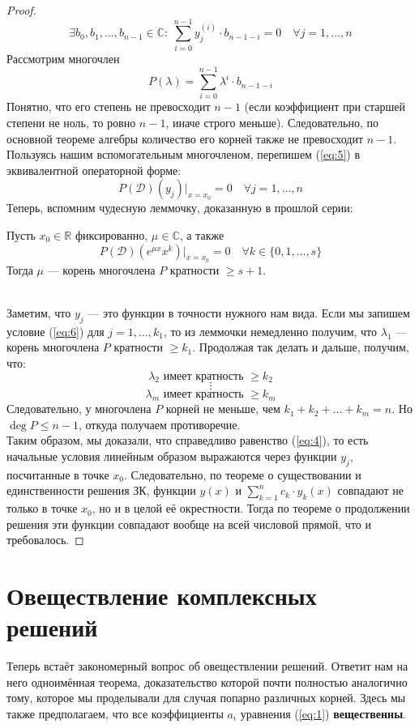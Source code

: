 \documentclass[11pt]{article}
\begin{document}
\begin{proof}
    \[\tag{5} \label{eq:5} \exists b_0, b_1, \dots, b_{n-1} \in \mathbb{C}: \ \sum_{i = 0}^{n - 1} y_j^{(i)} \cdot b_{n-1-i} = 0 \quad \forall j = 1, \dots, n\]
    Рассмотрим многочлен \[P(\lambda) = \sum_{i = 0}^{n-1} \lambda^i \cdot b_{n-1-i}\]
    Понятно, что его степень не превосходит $n - 1$ (если коэффициент при старшей степени не ноль, то ровно $n - 1$, иначе строго меньше). Следовательно, по основной теореме алгебры количество его корней также не превосходит $n - 1$. \\
    Пользуясь нашим вспомогательным многочленом, перепишем (\ref{eq:5}) в эквивалентной операторной форме:
    \[\tag{6} \label{eq:6} P(\mathcal{D})(y_j) \bigg|_{x = x_0} = 0 \quad \forall j = 1, \ldots, n\]
    Теперь, вспомним чудесную леммочку, доказанную в прошлой серии:
    \begin{lemma}
        Пусть $x_0 \in \mathbb{R}$ фиксированно, $\mu \in \mathbb{C}$, а также \[P(\mathcal{D}) \left(e^{\mu x} x^k\right) \bigg|_{x=x_0} = 0 
        \quad \forall k \in \{0, 1, \dots, s\}\]
        Тогда $\mu$ --- корень многочлена $P$ кратности $\geq s + 1$.
    \end{lemma} \leavevmode
    \\
    Заметим, что $y_j$ --- это функции в точности нужного нам вида. Если мы запишем условие (\ref{eq:6}) для $j = 1, \ldots, k_1$, то из леммочки немедленно получим, что $\lambda_1$ --- корень многочлена $P$ кратности $\geq k_1$. Продолжая так делать и дальше, получим, что:
    \[\lambda_2 \text{ имеет кратность } \geq k_2\]
    \[\vdots\]
    \[\lambda_m \text{ имеет кратность } \geq k_m\]
    Следовательно, у многочлена $P$ корней не меньше, чем $k_1 + k_2 + \ldots + k_m = n$. Но $\deg P \leq n - 1$, откуда получаем противоречие. \\
    Таким образом, мы доказали, что справедливо равенство (\ref{eq:4}), то есть начальные условия линейным образом выражаются через функции $y_j$, посчитанные в точке $x_0$. Следовательно, по теореме о существовании и единственности решения ЗК, функции $y(x)$ и $\sum_{k = 1}^n c_k \cdot y_k(x)$ совпадают не только в точке $x_0$, но и в целой её окрестности. Тогда по теореме о продолжении решения эти функции совпадают вообще на всей числовой прямой, что и требовалось.
\end{proof}

\section{Овеществление комплексных решений}
Теперь встаёт закономерный вопрос об овеществлении решений. Ответит нам на него одноимённая теорема, доказательство которой почти полностью аналогично тому, которое мы проделывали для случая попарно различных корней.
Здесь мы также предполагаем, что все коэффициенты $a_i$ уравнения (\ref{eq:1}) \textbf{вещественны}.
\end{document}
